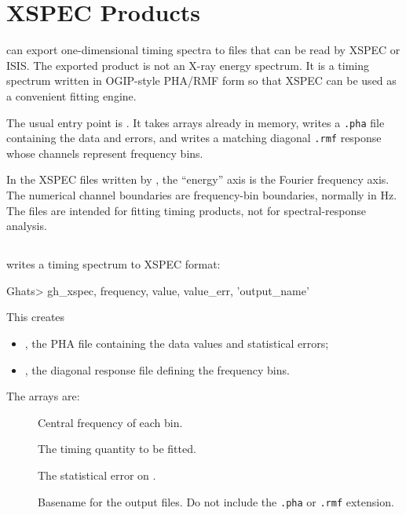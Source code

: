 \chapter{XSPEC Products}

\ghats{} can export one-dimensional timing spectra to files that can be read
by XSPEC or ISIS.  The exported product is not an X-ray energy spectrum.  It is
a timing spectrum written in OGIP-style PHA/RMF form so that XSPEC can be used
as a convenient fitting engine.

The usual entry point is .  It takes arrays already in
memory, writes a \texttt{.pha} file containing the data and errors, and writes
a matching diagonal \texttt{.rmf} response whose channels represent frequency
bins.

\begin{ghatsnote}
In the XSPEC files written by \ghats{}, the ``energy'' axis is the Fourier
frequency axis.  The numerical channel boundaries are frequency-bin boundaries,
normally in Hz.  The files are intended for fitting timing products, not for
spectral-response analysis.
\end{ghatsnote}

\section{}

 writes a timing spectrum to XSPEC format:

\begin{ghatsconsole}
Ghats> gh_xspec, frequency, value, value_err, 'output_name'
\end{ghatsconsole}

This creates

\begin{itemize}
  \item {}, the PHA file containing the data values and
        statistical errors;
  \item {}, the diagonal response file defining the
        frequency bins.
\end{itemize}

The arrays are:

\begin{description}
\item[] Central frequency of each bin.
\item[] The timing quantity to be fitted.
\item[] The statistical error on .
\item[] Basename for the output files.  Do not include the
  \texttt{.pha} or \texttt{.rmf} extension.
\end{description}

